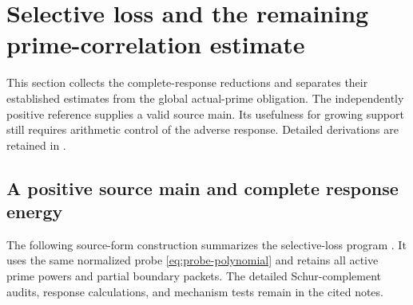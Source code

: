 \documentclass[11pt]{article}
\numberwithin{equation}{section}
\theoremstyle{definition}
\theoremstyle{remark}
\begin{document}
\section{Selective loss and the remaining prime-correlation estimate}
\label{sec:selective-loss-summary}

This section collects the complete-response reductions and separates
their established estimates from the global actual-prime obligation.
The independently positive reference supplies a valid source main.
Its usefulness for growing support still requires arithmetic control of
the adverse response. Detailed derivations are retained in
\cite{SelectiveLossNotes,DyadicCorrelationNotes,ActualErrorNotes}.

\subsection{A positive source main and complete response energy}

The following source-form construction summarizes the selective-loss
program \cite{SelectiveLossNotes}. It uses the same normalized probe
\eqref{eq:probe-polynomial} and retains all active prime powers and
partial boundary packets. The detailed Schur-complement audits,
response calculations, and mechanism tests remain in the cited notes.
\end{document}
